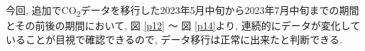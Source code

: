 今回, 追加でCO\textsubscript{2}データを移行した2023年5月中旬から2023年7月中旬までの期間とその前後の期間において, 図 \ref{p12} 〜 図 \ref{p14}より, 連続的にデータが変化していることが目視で確認できるので, データ移行は正常に出来たと判断できる.








